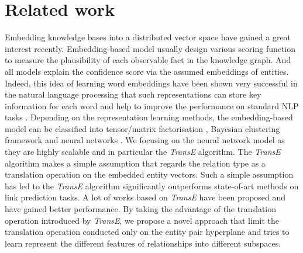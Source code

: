 \documentclass[10pt,journal]{IEEEtran}
\begin{document}
\section{Related work} \label{review}
Embedding knowledge bases into a distributed vector space have gained a great interest recently. Embedding-based model usually design various scoring function to measure the plausibility of each observable fact in the knowledge graph. And all models explain the confidence score via the assumed embeddings of entities. Indeed, this idea of learning word embeddings  have been shown very successful in the natural language processing that such representations can store key information for each word and help to improve the performance on standard NLP tasks \cite{bengio_neural_2006}.  Depending on the representation learning methods, the embedding-based model can be classified into tensor/matrix factorisation \cite{singh_relational_2008} \cite{nickel_three-way_2011}, Bayesian clustering framework \cite{kemp_learning_2006} \cite{sutskever_modelling_2009} and neural networks \cite{bordes_learning_2011} \cite{jenatton_latent_2012} \cite{bordes_translating_2013} \cite{socher_reasoning_2013} \cite{bordes_semantic_2014} \cite{wang_knowledge_2014} \cite{lin_learning_2015} \cite{garcia-duran_composing_????}. We focusing on the neural network model as they are highly scalable and in particular the \emph{TransE} \cite{bordes_translating_2013} algorithm. The \emph{TransE} algorithm makes a simple assumption that regards the relation type as a translation operation on the embedded entity vectors. Such a simple assumption has led to the \emph{TransE} algorithm significantly outperforms state-of-art methods on link prediction tasks. A lot of works \cite{fan_transition-based_2014} \cite{wang_knowledge_2014} \cite{lin_learning_2015} \cite{garcia-duran_composing_????}  based on \emph{TransE} have been proposed and have gained better performance. By taking the advantage of the translation operation introduced by \emph{TransE}, we propose a novel approach that limit the translation operation conducted only on the entity pair hyperplane and tries to learn represent the different features of relationships into different subspaces.
\end{document}
